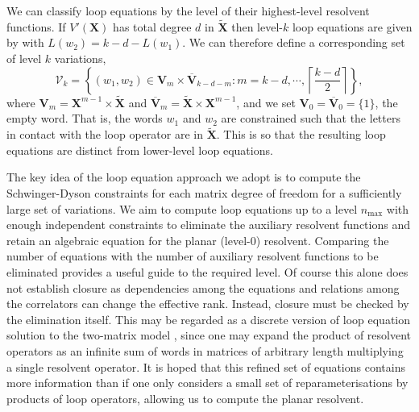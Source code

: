 We can classify loop equations by the level of their highest-level resolvent functions. If
$V'(\mathbf{X})$ has total degree $d$ in $\tilde{\mathbf{X}}$ then level-$k$ loop
equations are given by  with $L(w_2)=k-d-L(w_1)$. We can therefore define a
corresponding set of level $k$ variations,
%
\begin{equation}
    \label{var}
    \mathcal{V}_k = \left\{ (w_1,w_2)\in\mathbf{V}_m\times\overline{\mathbf{V}}_{k-d-m} : m=k-d,\cdots, \left\lceil\frac{k-d}{2}\right\rceil \right\},
\end{equation}
%
where $\mathbf{V}_m=\mathbf{X}^{m-1}\times \tilde{\mathbf{X}}$ and $\overline{\mathbf{V}}_m =
    \tilde{\mathbf{X}}\times\mathbf{X}^{m-1}$, and we set $\mathbf{V}_0 = \overline{\mathbf{V}}_0 = \{1\}$, the empty word. That is, the words $w_1$ and $w_2$ are constrained such
that the letters in contact with the loop operator are in $\tilde{\mathbf{X}}$. This is so that the
resulting loop equations are distinct from lower-level loop equations.

The key idea of the loop equation approach we adopt is to compute the Schwinger-Dyson constraints
for each matrix degree of freedom for a sufficiently large set of variations. We aim to compute
loop equations up to a level $n_{\mathrm{max}}$ with enough independent constraints to eliminate
the auxiliary resolvent functions and retain an algebraic equation for the planar (level-0)
resolvent. Comparing the number of equations with the number of auxiliary resolvent functions to be
eliminated provides a useful guide to the required level. Of course this alone does not establish
closure as dependencies among the equations and relations among the correlators can change the effective rank. Instead, closure must be checked by the
elimination itself. This may be regarded as a discrete version of loop equation solution to the
two-matrix model \cite{Eynard:2002kg}, since one may expand the product of resolvent operators as
an infinite sum of words in matrices of arbitrary length multiplying a single resolvent operator.
It is hoped that this refined set of equations contains more information than if one only considers
a small set of reparameterisations by products of loop operators, allowing us to compute the planar
resolvent.
